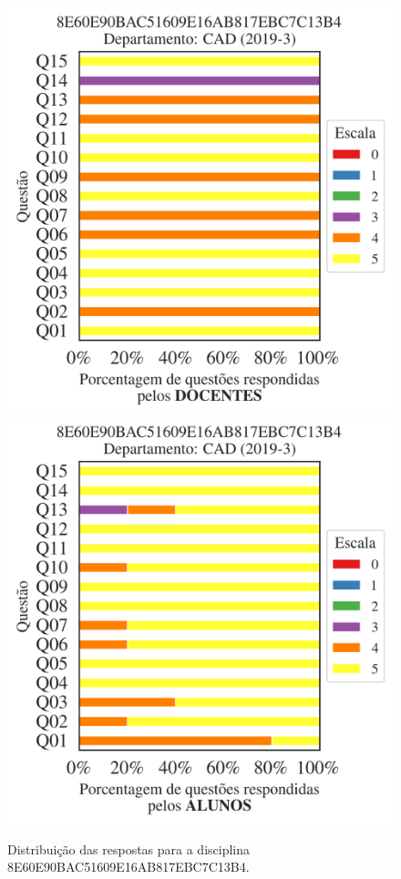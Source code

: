 \documentclass[a4paper,10pt]{article}
\begin{document}
\begin{figure}[h]
\centering
\includegraphics[width=0.485\linewidth]{analise_disciplina_departamento_CAD_8E60E90BAC51609E16AB817EBC7C13B4_docentes.png}
\includegraphics[width=0.485\linewidth]{analise_disciplina_departamento_CAD_8E60E90BAC51609E16AB817EBC7C13B4_alunos.png}
\caption{\label{fig:analise_geral_departamento}                Distribuição das respostas para a disciplina 8E60E90BAC51609E16AB817EBC7C13B4. }
\end{figure}
\end{document}
